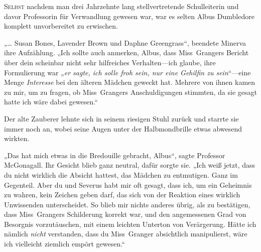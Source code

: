 
\lettrine{S}{elbst} nachdem man drei Jahrzehnte lang stellvertretende Schulleiterin und davor Professorin für Verwandlung gewesen war, war es selten Albus Dumbledore komplett unvorbereitet zu erwischen.

„… Susan Bones, Lavender Brown und Daphne Greengrass“, beendete Minerva ihre Aufzählung. „Ich sollte auch anmerken, Albus, dass Miss~Grangers Bericht über dein scheinbar nicht sehr hilfreiches Verhalten—ich glaube, ihre Formulierung war „\emph{er sagte, ich solle froh sein, nur eine Gehilfin zu sein}“—eine Menge \emph{Interesse} bei den älteren Mädchen geweckt hat. Mehrere von ihnen kamen zu mir, um zu fragen, ob Miss~Grangers Anschuldigungen stimmten, da sie gesagt hatte ich wäre dabei gewesen.“

Der alte Zauberer lehnte sich in seinem riesigen Stuhl zurück und starrte sie immer noch an, wobei seine Augen unter der Halbmondbrille etwas abwesend wirkten.

„Das hat mich etwas in die Bredouille gebracht, Albus“, sagte Professor McGonagall. Ihr Gesicht blieb ganz neutral, dafür sorgte sie. „Ich weiß jetzt, dass du nicht wirklich die Absicht hattest, das Mädchen zu entmutigen. Ganz im Gegenteil. Aber du und Severus habt mir oft gesagt, dass ich, um ein Geheimnis zu wahren, kein Zeichen geben darf, das sich von der Reaktion eines wirklich Unwissenden unterscheidet. So blieb mir nichts anderes übrig, als zu bestätigen, dass Miss~Grangers Schilderung korrekt war, und den angemessenen Grad von Besorgnis vorzutäuschen, mit einem leichten Unterton von Verärgerung. Hätte ich nämlich \emph{nicht} verstanden, dass du Miss~Granger absichtlich manipulierst, wäre ich vielleicht ziemlich empört gewesen.“

